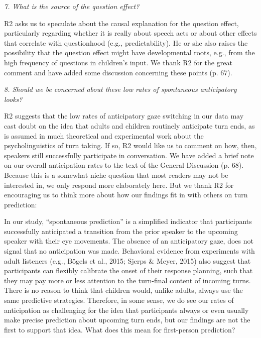 \documentclass[11pt,a4paper]{letter} %
\begin{document}
\begin{letter}{}
\noindent \textit{7. What is the source of the question effect?}

\noindent R2 asks us to speculate about the causal explanation for the question effect, particularly regarding whether it is really about speech acts or about other effects that correlate with questionhood (e.g., predictability). He or she also raises the possibility that the question effect might have developmental roots, e.g., from the high frequency of questions in children's input. We thank R2 for the great comment and have added some discussion concerning these points (p. 67).

\newpage

\noindent \textit{8. Should we be concerned about these low rates of spontaneous anticipatory looks?}

\noindent R2 suggests that the low rates of anticipatory gaze switching in our data may cast doubt on the idea that adults and children routinely anticipate turn ends, as is assumed in much theoretical and experimental work about the psycholinguistics of turn taking. If so, R2 would like us to comment on how, then, speakers still successfully participate in conversation. We have added a brief note on our overall anticipation rates to the text of the General Discussion (p. 68). Because this is a somewhat niche question that most readers may not be interested in, we only respond more elaborately here. But we thank R2 for encouraging us to think more about how our findings fit in with others on turn prediction:

\noindent In our study, ``spontaneous prediction'' is a simplified indicator that participants successfully anticipated a transition from the prior speaker to the upcoming speaker with their eye movements. The absence of an anticipatory gaze, does not signal that no anticipation was made. Behavioral evidence from experiments with adult listeners (e.g., B\"{o}gels et al., 2015; Sjerps \& Meyer, 2015) also suggest that participants can flexibly calibrate the onset of their response planning, such that they may pay more or less attention to the turn-final content of incoming turns. There is no reason to think that children would, unlike adults, always use the same predictive strategies. Therefore, in some sense, we do see our rates of anticipation as challenging for the idea that participants always or even usually make precise prediction about upcoming turn ends, but our findings are not the first to support that idea. What does this mean for first-person prediction?


\end{letter}
\end{document}
